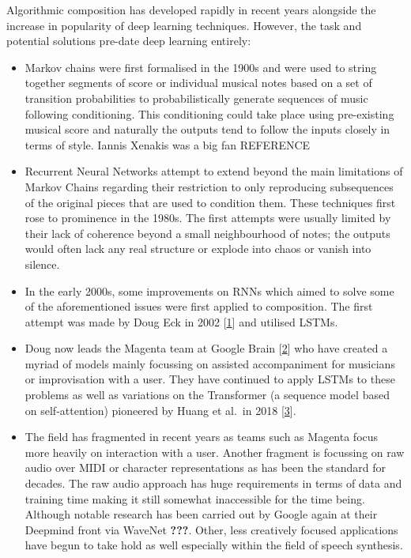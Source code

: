 \documentclass[12pt,]{article}
\providecommand{\tightlist}{%
  \setlength{\itemsep}{0pt}\setlength{\parskip}{0pt}}
\begin{document}
Algorithmic composition has developed rapidly in recent years alongside
the increase in popularity of deep learning techniques. However, the
task and potential solutions pre-date deep learning entirely:

\begin{itemize}
\tightlist
\item
  Markov chains were first formalised in the 1900s and were used to
  string together segments of score or individual musical notes based on
  a set of transition probabilities to probabilistically generate
  sequences of music following conditioning. This conditioning could
  take place using pre-existing musical score and naturally the outputs
  tend to follow the inputs closely in terms of style. Iannis Xenakis
  was a big fan REFERENCE
\item
  Recurrent Neural Networks attempt to extend beyond the main
  limitations of Markov Chains regarding their restriction to only
  reproducing subsequences of the original pieces that are used to
  condition them. These techniques first rose to prominence in the
  1980s. The first attempts were usually limited by their lack of
  coherence beyond a small neighbourhood of notes; the outputs would
  often lack any real structure or explode into chaos or vanish into
  silence.
\item
  In the early 2000s, some improvements on RNNs which aimed to solve
  some of the aforementioned issues were first applied to composition.
  The first attempt was made by Doug Eck in 2002
  {[}\protect\hyperlink{ref-eck2002finding}{1}{]} and utilised LSTMs.
\item
  Doug now leads the Magenta team at Google Brain
  {[}\protect\hyperlink{ref-magenta}{2}{]} who have created a myriad of
  models mainly focussing on assisted accompaniment for musicians or
  improvisation with a user. They have continued to apply LSTMs to these
  problems as well as variations on the Transformer (a sequence model
  based on self-attention) pioneered by Huang et al.~in 2018
  {[}\protect\hyperlink{ref-huang2018improved}{3}{]}.
\item
  The field has fragmented in recent years as teams such as Magenta
  focus more heavily on interaction with a user. Another fragment is
  focussing on raw audio over MIDI or character representations as has
  been the standard for decades. The raw audio approach has huge
  requirements in terms of data and training time making it still
  somewhat inaccessible for the time being. Although notable research
  has been carried out by Google again at their Deepmind front via
  WaveNet {\textbf{???}}. Other, less creatively focused applications
  have begun to take hold as well especially within the field of speech
  synthesis.
\end{itemize}
\end{document}
